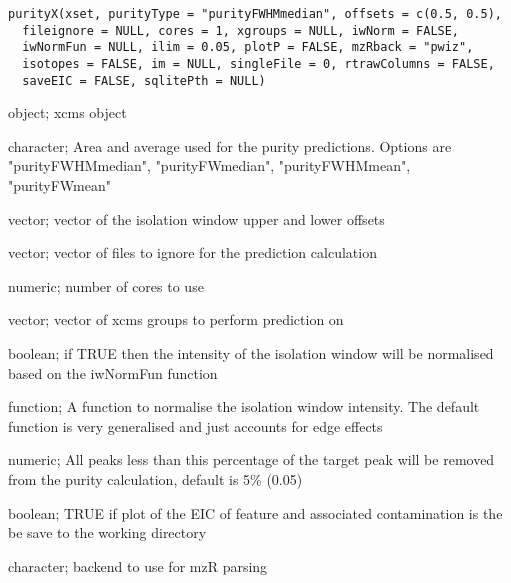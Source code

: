 \documentclass[letterpaper]{book}
\begin{document}
%
\begin{Usage}
\begin{verbatim}
purityX(xset, purityType = "purityFWHMmedian", offsets = c(0.5, 0.5),
  fileignore = NULL, cores = 1, xgroups = NULL, iwNorm = FALSE,
  iwNormFun = NULL, ilim = 0.05, plotP = FALSE, mzRback = "pwiz",
  isotopes = FALSE, im = NULL, singleFile = 0, rtrawColumns = FALSE,
  saveEIC = FALSE, sqlitePth = NULL)
\end{verbatim}
\end{Usage}
%
\begin{Arguments}
\begin{ldescription}
\item[\code{xset}] object; xcms object

\item[\code{purityType}] character; Area and average used for the purity predictions. Options are
"purityFWHMmedian", "purityFWmedian", "purityFWHMmean", "purityFWmean"

\item[\code{offsets}] vector; vector of the isolation window upper and lower offsets

\item[\code{fileignore}] vector; vector of files to ignore for the prediction calculation

\item[\code{cores}] numeric; number of cores to use

\item[\code{xgroups}] vector; vector of xcms groups to perform prediction on

\item[\code{iwNorm}] boolean; if TRUE then the intensity of the isolation window will be normalised based on the iwNormFun function

\item[\code{iwNormFun}] function; A function to normalise the isolation window intensity. The default function is very generalised and just accounts for edge effects

\item[\code{ilim}] numeric; All peaks less than this percentage of the target peak will be removed from the purity calculation, default is 5\% (0.05)

\item[\code{plotP}] boolean; TRUE if plot of the EIC of feature and associated contamination is the be save to the working directory

\item[\code{mzRback}] character; backend to use for mzR parsing


\end{ldescription}
\end{Arguments}
\end{document}
